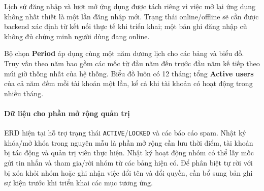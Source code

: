 Lịch sử đăng nhập và lượt mở ứng dụng được tách riêng vì việc mở lại ứng dụng
không nhất thiết là một lần đăng nhập mới. Trạng thái online/offline sẽ cần
được backend xác định từ kết nối thực tế khi triển khai; một bản ghi đăng nhập
cũ không đủ chứng minh người dùng đang online.

Bộ chọn \textbf{Period} áp dụng cùng một năm dương lịch cho các bảng và biểu đồ.
Truy vấn theo năm bao gồm các mốc từ đầu năm đến trước đầu năm kế tiếp theo
múi giờ thống nhất của hệ thống. Biểu đồ luôn có 12 tháng; tổng
\textbf{Active users} của cả năm đếm mỗi tài khoản một lần, kể cả khi tài khoản
có hoạt động trong nhiều tháng.

\paragraph{Dữ liệu cho phần mở rộng quản trị}
\mbox{}\par
ERD hiện tại hỗ trợ trạng thái \texttt{ACTIVE}/\texttt{LOCKED} và các báo cáo
spam. Nhật ký khóa/mở khóa trong nguyên mẫu là phần mở rộng cần lưu thời điểm,
tài khoản bị tác động và quản trị viên thực hiện. Nhật ký hoạt động nhóm có thể
lấy mốc gửi tin nhắn và tham gia/rời nhóm từ các bảng hiện có. Để phân biệt
tự rời với bị xóa khỏi nhóm hoặc ghi nhận việc đổi tên và đổi quyền, cần bổ
sung bản ghi sự kiện trước khi triển khai các mục tương ứng.
